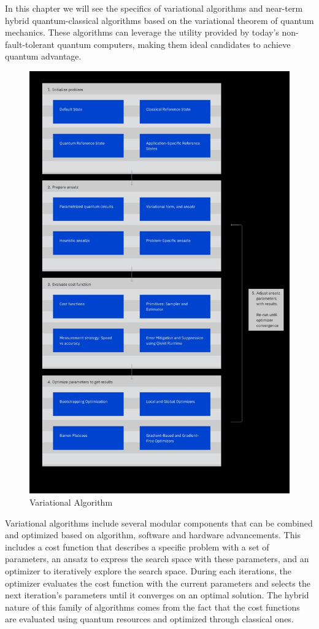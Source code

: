 \documentclass[12pt, oneside]{book}
\theoremstyle{definition}
\theoremstyle{definition}
\theoremstyle{remark}
\begin{document}
In this chapter we will see the specifics of variational algorithms and near-term hybrid quantum-classical algorithms based on the variational theorem of quantum mechanics. These algorithms can leverage the utility provided by today's non-fault-tolerant quantum computers, making them ideal candidates to achieve quantum advantage.

\begin{figure}
    \centering
    \includegraphics[width=0.75\linewidth]{../images/VQE_algo.png}
    \caption{Variational Algorithm}
    \label{figvqe_algo}
\end{figure}

Variational algorithms include several modular components that can be combined and optimized based on algorithm, software and hardware advancements. This includes a cost function that describes a specific problem with a set of parameters, an ansatz to express the search space with these parameters, and an optimizer to iteratively explore the search space. During each iterations, the optimizer evaluates the cost function with the current parameters and selects the next iteration's parameters until it converges on an optimal solution. The hybrid nature of this family of algorithms comes from the fact that the cost functions are evaluated using quantum resources and optimized through classical ones.
\end{document}
